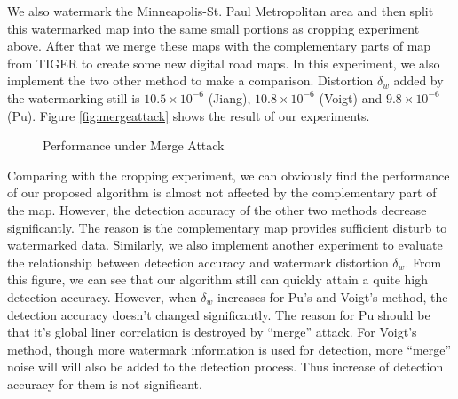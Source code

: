 We also watermark the Minneapolis-St. Paul Metropolitan area and then split this 
watermarked map into the same small portions as cropping experiment above. After 
that we merge these maps with the complementary parts of map from TIGER to create 
some new digital road maps. In this experiment, we also implement the two other 
method to make a comparison. Distortion $\delta_w$ added by the watermarking still
is $10.5\times 10^{ -6 }$ (Jiang), $10.8\times 10^{-6}$ (Voigt) and $9.8\times 10^{-6}$ (Pu). 
Figure \ref{fig:mergeattack} shows the result of our 
experiments.


\begin{figure}[h]
\centering
{}
\caption{Performance under Merge Attack}
\end{figure}

Comparing with the cropping experiment, we can obviously find the performance of 
our proposed algorithm is almost not affected by the complementary part of the map. 
However, the detection accuracy of the other two methods decrease significantly. 
The reason is the complementary map provides sufficient disturb to watermarked data.
Similarly, we also implement another experiment to evaluate the relationship between
detection accuracy and watermark distortion $\delta_w$. From this figure, we can see that
our algorithm still can quickly attain a quite high detection accuracy. However, when 
$\delta_w$ increases for Pu's and Voigt's method, the detection accuracy doesn't changed significantly.
The reason for Pu should be that it's global liner correlation is destroyed by ``merge'' attack.
For Voigt's method, though more watermark information is used for detection, more ``merge'' 
noise will will also be added to the detection process. Thus increase of detection accuracy
for them is not significant.






